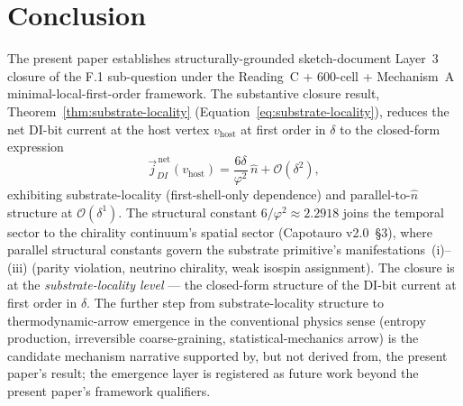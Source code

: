 \documentclass[11pt,letterpaper]{article}
\newcommand{\phig}{\varphi}
\newcommand{\vhost}{v_{\text{host}}}
\newcommand{\jDInet}{\vec{j}_{DI}^{\,\text{net}}}
\newcommand{\bigO}[1]{\mathcal{O}(#1)}
\begin{document}
\section{Conclusion}
\label{sec:conclusion}


The present paper establishes structurally-grounded sketch-document Layer~3 closure of the F.1 sub-question under the Reading~C + 600-cell + Mechanism~A minimal-local-first-order framework. The substantive closure result, Theorem~\ref{thm:substrate-locality} (Equation~\eqref{eq:substrate-locality}), reduces the net DI-bit current at the host vertex $\vhost$ at first order in $\delta$ to the closed-form expression
\[
\jDInet(\vhost) = \frac{6 \delta}{\phig^2} \, \hat{n} + \bigO{\delta^2},
\]
exhibiting substrate-locality (first-shell-only dependence) and parallel-to-$\hat{n}$ structure at $\bigO{\delta^1}$. The structural constant $6/\phig^2 \approx 2.2918$ joins the temporal sector to the chirality continuum's spatial sector (Capotauro v2.0~\S3), where parallel structural constants govern the substrate primitive's manifestations~(i)--(iii) (parity violation, neutrino chirality, weak isospin assignment). The closure is at the \emph{substrate-locality level} --- the closed-form structure of the DI-bit current at first order in $\delta$. The further step from substrate-locality structure to thermodynamic-arrow emergence in the conventional physics sense (entropy production, irreversible coarse-graining, statistical-mechanics arrow) is the candidate mechanism narrative supported by, but not derived from, the present paper's result; the emergence layer is registered as future work beyond the present paper's framework qualifiers.
\end{document}
